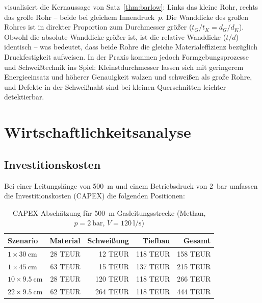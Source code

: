﻿\documentclass[12pt,a4paper,twoside]{article}
\theoremstyle{plain}
\theoremstyle{definition}
\theoremstyle{remark}
\begin{document}
\noindent
{} visualisiert die Kernaussage von Satz~\ref{thm:barlow}:
Links das kleine Rohr, rechts das große Rohr -- beide bei gleichem Innendruck~$p$.
Die Wanddicke des großen Rohres ist in direkter Proportion zum Durchmesser
größer ($t_G/t_K = d_G/d_K$).
Obwohl die absolute Wanddicke größer ist, ist die relative Wanddicke ($t/d$)
identisch -- was bedeutet, dass beide Rohre die gleiche Materialeffizienz
bezüglich Druckfestigkeit aufweisen.
In der Praxis kommen jedoch Formgebungsprozesse und Schweiß\-technik ins Spiel:
Kleinstdurchmesser lassen sich mit geringerem Energieeinsatz und höherer
Genauigkeit walzen und schweißen als große Rohre, und Defekte in der Schweißnaht
sind bei kleinen Querschnitten leichter detektierbar.

\section{Wirtschaftlichkeitsanalyse}
\label{sec:wirtschaft}

\subsection{Investitionskosten}
\label{ssec:capex}

Bei einer Leitungslänge von \SI{500}{\metre} und einem Betriebsdruck von
\SI{2}{\bar} umfassen die Investitionskosten (CAPEX) die folgenden Positionen:

\begin{table}[htbp]
\centering
\caption{CAPEX-Abschätzung für \SI{500}{\metre} Gasleitungsstrecke
         (Methan, $p = \SI{2}{\bar}$, $\dot{V} = \SI{120}{\litre\per\second}$)}
\label{tab:capex}
\begin{tabular}{@{}lrrrr@{}}
\toprule
Szenario & Material & Schweißung & Tiefbau & Gesamt \\
\midrule
$1 \times \SI{30}{\centi\metre}$         & 28 TEUR & 12 TEUR & 118 TEUR & 158 TEUR \\
$1 \times \SI{45}{\centi\metre}$         & 63 TEUR & 15 TEUR & 137 TEUR & 215 TEUR \\
$10 \times \SI{9.5}{\centi\metre}$       & 28 TEUR & 120 TEUR & 118 TEUR & 266 TEUR \\
$22 \times \SI{9.5}{\centi\metre}$       & 62 TEUR & 264 TEUR & 118 TEUR & 444 TEUR \\
\bottomrule
\end{tabular}
\end{table}
\end{document}
